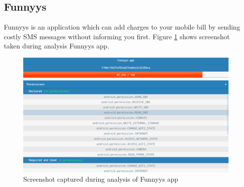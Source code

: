 \subsection{Funnyys}
Funnyys is an application which can add charges to your mobile bill by sending costly SMS messages without informing you first. Figure \ref{fig:funnyys} shows screenshot taken during analysis Funnyys app.
\begin{figure}[!h]
  \centering
  \includegraphics [scale=0.5] {funnyys.png}
  \caption{Screenshot captured during analysis of Funnyys app}
  \label{fig:funnyys}
\end{figure}
